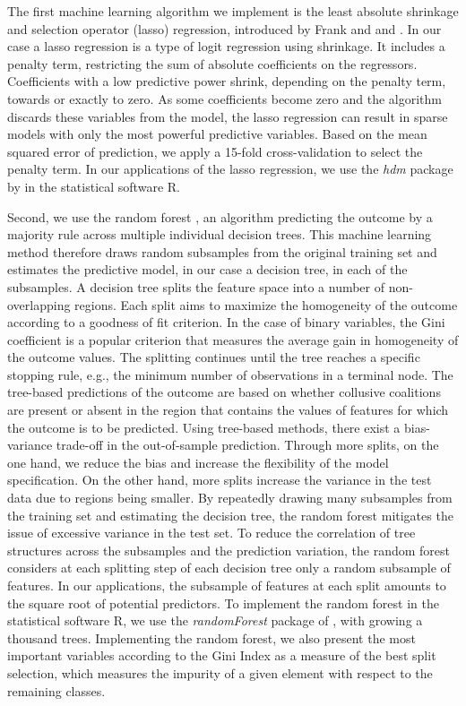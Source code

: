 \documentclass[a4paper,11pt]{article}
\begin{document}
	The first machine learning algorithm we implement is the least absolute shrinkage and selection operator (lasso) regression, introduced by Frank and \cite{frank1993statistical} and \cite{Tibshirani1996}. In our case a lasso regression is a type of logit regression using shrinkage. It includes a penalty term, restricting the sum of absolute coefficients on the regressors. Coefficients with a low predictive power shrink, depending on the penalty term, towards or exactly to zero. As some coefficients become zero and the algorithm discards these variables from the model, the lasso regression can result in sparse models with only the most powerful predictive variables. Based on the mean squared error of prediction, we apply a 15-fold cross-validation to select the penalty term. In our applications of the lasso regression, we use the \textit{hdm} package by \cite{Chern2016} in the statistical software R. 
	
	Second, we use the random forest \citep[see][]{Breiman2001}, an algorithm predicting the outcome by a majority rule across multiple individual decision trees. This machine learning method therefore draws random subsamples from the original training set and estimates the predictive model, in our case a decision tree, in each of the subsamples. A decision tree splits the feature space into a number of non-overlapping regions. Each split aims to maximize the homogeneity of the outcome according to a goodness of fit criterion. In the case of binary variables, the Gini coefficient is a popular criterion that measures the average gain in homogeneity of the outcome values. The splitting continues until the tree reaches a specific stopping rule, e.g., the minimum number of observations in a terminal node. The tree-based predictions of the outcome are based on whether collusive coalitions are present or absent in the region that contains the values of features for which the outcome is to be predicted. Using tree-based methods, there exist a bias-variance trade-off in the out-of-sample prediction. Through more splits, on the one hand, we reduce the bias and increase the flexibility of the model specification. On the other hand, more splits increase the variance in the test data due to regions being smaller. By repeatedly drawing many subsamples from the training set and estimating the decision tree, the random forest mitigates the issue of excessive variance in the test set. To reduce the correlation of tree structures across the subsamples and the prediction variation, the random forest considers at each splitting step of each decision tree only a random subsample of features. In our applications, the subsample of features at each split amounts to the square root of potential predictors. To implement the random forest in the statistical software R, we use the \textit{randomForest} package of \cite{Liaw2018randomForest}, with growing a thousand trees. Implementing the random forest, we also present the most important variables according to the Gini Index as a measure of the best split selection, which measures the impurity of a given element with respect to the remaining classes. 
	
\end{document}
